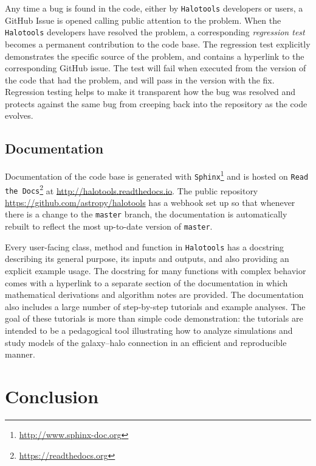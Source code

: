\documentclass[twocolumn, tighten]{aastex6}
\begin{document}
Any time a bug is found in the code, either by {\tt Halotools} developers or users, a GitHub Issue is opened calling public attention to the problem. When the {\tt Halotools} developers have resolved the problem, a corresponding {\em regression test} becomes a permanent contribution to the code base. The regression test explicitly demonstrates the specific source of the problem, and contains a hyperlink to the corresponding GitHub issue. The test will fail when executed from the version of the code that had the problem, and will pass in the version with the fix. Regression testing helps to make it transparent how the bug was resolved and protects against the same bug from creeping back into the repository as the code evolves.

\subsection{Documentation}
\label{subsection:documentation}

Documentation of the code base is generated with {\tt Sphinx}\footnote{\url{http://www.sphinx-doc.org}} and is hosted on {\tt Read the Docs}\footnote{\url{ https://readthedocs.org}} at \url{http://halotools.readthedocs.io}. The public repository \url{https://github.com/astropy/halotools} has a webhook set up so that whenever there is a change to the {\tt master} branch, the documentation is automatically rebuilt to reflect the most up-to-date version of {\tt master}.

Every user-facing class, method and function in {\tt Halotools} has a docstring describing its general purpose, its inputs and outputs, and also providing an explicit example usage. The docstring for many functions with complex behavior comes with a hyperlink to a separate section of the documentation in which mathematical derivations and algorithm notes are provided. The documentation also includes a large number of step-by-step tutorials and example analyses. The goal of these tutorials is more than simple code demonstration: the tutorials are intended to be a pedagogical tool illustrating how to analyze simulations and study models of the galaxy--halo connection in an efficient and reproducible manner.

\section{Conclusion}
\label{section:conclusion}
\end{document}
